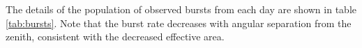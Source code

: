 


The details of the population of observed bursts from each day are shown in table \ref{tab:bursts}. Note that the burst rate decreases with angular separation from the zenith, consistent with the decreased effective area. 




